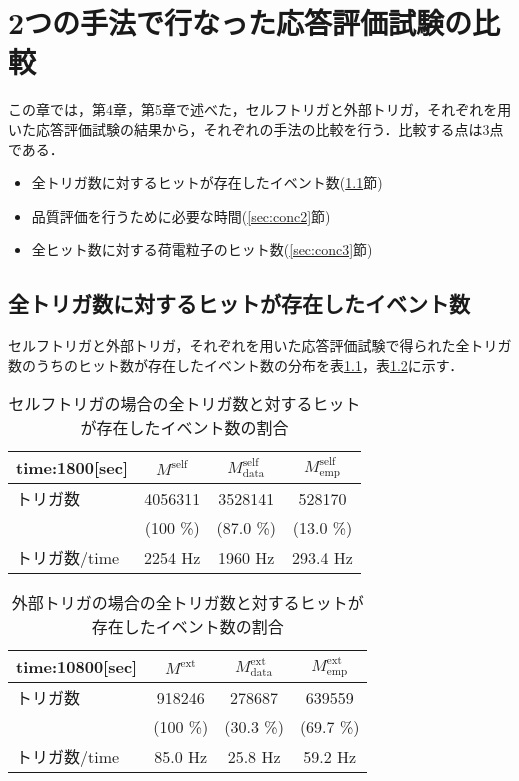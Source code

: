 \chapter{2つの手法で行なった応答評価試験の比較}
この章では，第4章，第5章で述べた，セルフトリガと外部トリガ，それぞれを用いた応答評価試験の結果から，それぞれの手法の比較を行う．比較する点は3点である．
\begin{itemize}
\item 全トリガ数に対するヒットが存在したイベント数(\ref{sec:conc1}節)
\item 品質評価を行うために必要な時間(\ref{sec:conc2}節)
\item 全ヒット数に対する荷電粒子のヒット数(\ref{sec:conc3}節)
\end{itemize}


\section{全トリガ数に対するヒットが存在したイベント数}
\label{sec:conc1}
セルフトリガと外部トリガ，それぞれを用いた応答評価試験で得られた全トリガ数のうちのヒット数が存在したイベント数の分布を表\ref{tab:selfrcomp}，表\ref{tab:extrcomp}に示す．

\begin{table}[h]
  \centering
  \caption{セルフトリガの場合の全トリガ数と対するヒットが存在したイベント数の割合}
  \begin{tabular} {l|ccc} \hline
    time:1800[sec] & $M^{\mathrm{self}}$ & $M_{\mathrm{data}}^{\mathrm{self}}$ & $M_{\mathrm{emp}}^{\mathrm{self}}$ \\ \hline \hline
    トリガ数 & 4056311 & 3528141 & 528170 \\
     & (100 \%) & (87.0 \%) & (13.0 \%) \\ \hline
    トリガ数/time & 2254 $\mathrm{Hz}$ & 1960 $\mathrm{Hz}$ & 293.4 $\mathrm{Hz}$ \\ \hline
  \end{tabular}
  \label{tab:selfrcomp}
\end{table}

\begin{table}[h]
  \centering
  \caption{外部トリガの場合の全トリガ数と対するヒットが存在したイベント数の割合}
  \begin{tabular} {l|ccc} \hline
    time:10800[sec] & $M^{\mathrm{ext}}$ & $M_{\mathrm{data}}^{\mathrm{ext}}$ & $M_{\mathrm{emp}}^{\mathrm{ext}}$ \\ \hline \hline
    トリガ数 & 918246 & 278687 & 639559 \\
     & (100 \%) & (30.3 \%) & (69.7 \%) \\ \hline
    トリガ数/time & 85.0 $\mathrm{Hz}$ & 25.8 $\mathrm{Hz}$ & 59.2 $\mathrm{Hz}$ \\ \hline
  \end{tabular}
  \label{tab:extrcomp}
\end{table}

